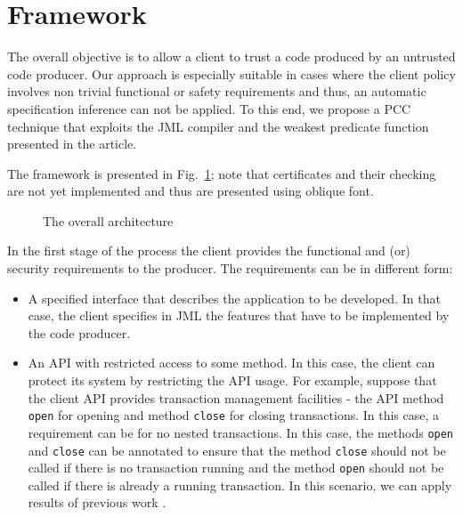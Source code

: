 \section{Framework}
\label{architecture_s}	


The overall objective is to allow a client to trust a code produced by an untrusted code producer. Our approach is especially suitable
 in cases where the client policy involves non trivial functional or safety requirements and thus, an automatic specification inference
 can not be applied. To this end, we propose a PCC technique that exploits the JML compiler and the weakest predicate function presented in the article. 
 
 The framework is presented in Fig.~\ref{architecture}; note that certificates and their checking are not yet implemented
 and thus are presented using oblique font.
  

\begin{figure}[!tbp]
\begin{center}
\caption{\sc The overall architecture}
\label{architecture}
\end{center}
\end{figure}

In the first stage of the process the client provides the functional and (or) security requirements to the producer.
 The requirements can be in different form:
\begin{itemize}
\item A specified interface that describes the application to be developed. In that case,
 the client specifies in JML the features that have to be implemented by the code producer.
\item An API with restricted access to some method. In this case, the client can protect its system by restricting the API usage.
For example, suppose that the client API provides transaction management facilities - the API method \texttt{open} for opening and method 
\texttt{close} for closing transactions. In this case, a requirement can be for no nested transactions.
In this case, the methods \texttt{open} and \texttt{close} can be annotated to ensure that the method \texttt{close} 
 should not be called if there is no transaction running and the method \texttt{open} should not be called if there is already a running transaction. 
In this scenario, we can apply results of previous work \cite{PBBHL}.  
\end{itemize}

